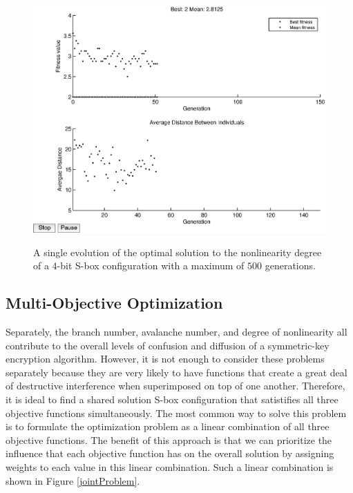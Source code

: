 \documentclass[11pt]{article}
\begin{document}
\begin{figure}
	\centering
	\includegraphics[scale=0.5]{images/nl_results16.eps} \\
	\label{nl16}
\caption{A single evolution of the optimal solution to the nonlinearity degree of a $4$-bit S-box configuration with a maximum of $500$ generations.}
\end{figure}

\subsection{Multi-Objective Optimization}
Separately, the branch number, avalanche number, and degree of nonlinearity all contribute to the overall levels of confusion and diffusion of a symmetric-key encryption algorithm. However, it is not enough to consider these problems separately because they are very likely to have functions that create a great deal of destructive interference when superimposed on top of one another. Therefore, it is ideal to find a shared solution S-box configuration that satistifies all three objective functions simultaneously. The most common way to solve this problem is to formulate the optimization problem as a linear combination of all three objective functions. The benefit of this approach is that we can prioritize the influence that each objective function has on the overall solution by assigning weights to each value in this linear combination. Such a linear combination is shown in Figure \ref{jointProblem}.
\end{document}
